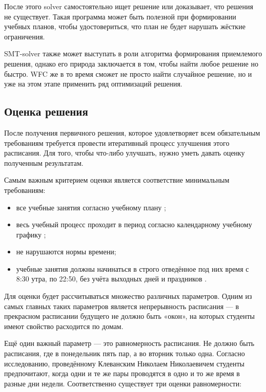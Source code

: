  После этого solver самостоятельно ищет решение или доказывает, что решения не существует. Такая программа может быть полезной при формировании учебных планов, чтобы удостовериться, что план не будет нарушать жёсткие ограничения.

 SMT-solver также может выступать в роли алгоритма формирования приемлемого решения, однако его природа заключается в том, чтобы найти любое решение но быстро. WFC же в то время сможет не просто найти случайное решение, но и уже на этом этапе применить ряд оптимизаций решения.

\subsection{Оценка решения}

После получения первичного решения, которое удовлетворяет всем обязательным требованиям требуется провести итеративный процесс улучшения этого расписания. Для того, чтобы что-либо улучшать, нужно уметь давать оценку полученным результатам.

Самым важным критерием оценки является соответствие минимальным требованиям:

\begin{itemize}
	\item все учебные занятия согласно учебному плану \cite{stankin:edu_programs};
	\item весь учебный процесс проходит в период согласно календарному учебному графику \cite{stankin:calendar};
	\item не нарушаются нормы времени;
	\item учебные занятия должны начинаться в строго отведённое под них время с 8:30 утра, по 22:50, без учёта выходных дней и праздников \cite{tkrf:112}.
\end{itemize}

Для оценки будет рассчитываться множество различных параметров. Одним из самых главных таких параметров является непрерывность расписания --- в прекрасном расписании будущего не должно быть «окон», на которых студенты имеют свойство расходится по домам.

Ещё один важный параметр --- это равномерность расписания. Не должно быть расписания, где в понедельник пять пар, а во вторник только одна. Согласно исследованию, проведённому Клеванским Николаем Николаевичем \cite{klivansky:forming_schedule} студенты предпочитают, когда одни и те же пары проводятся в одно и то же время в разные дни недели. Соответственно существует три оценки равномерности:

